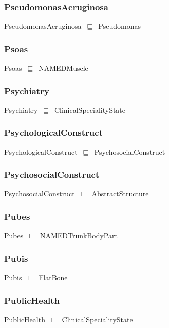 \documentclass{article}
\begin{document}
\subsubsection*{PseudomonasAeruginosa}

PseudomonasAeruginosa~\ensuremath{\sqsubseteq}~Pseudomonas~

\subsubsection*{Psoas}

Psoas~\ensuremath{\sqsubseteq}~NAMEDMuscle~

\subsubsection*{Psychiatry}

Psychiatry~\ensuremath{\sqsubseteq}~ClinicalSpecialityState~

\subsubsection*{PsychologicalConstruct}

PsychologicalConstruct~\ensuremath{\sqsubseteq}~PsychosocialConstruct~

\subsubsection*{PsychosocialConstruct}

PsychosocialConstruct~\ensuremath{\sqsubseteq}~AbstractStructure~

\subsubsection*{Pubes}

Pubes~\ensuremath{\sqsubseteq}~NAMEDTrunkBodyPart~

\subsubsection*{Pubis}

Pubis~\ensuremath{\sqsubseteq}~FlatBone~

\subsubsection*{PublicHealth}

PublicHealth~\ensuremath{\sqsubseteq}~ClinicalSpecialityState~
\end{document}
